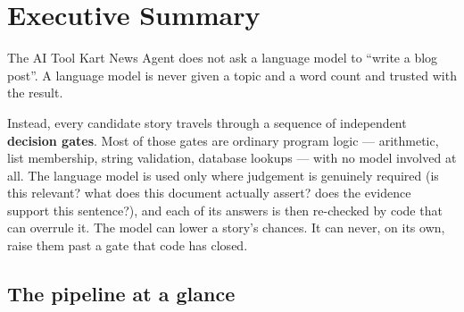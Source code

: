 \documentclass[11pt,a4paper]{article}
\begin{document}
\newpage
\hypersetup{pageanchor=true}
{\color{aitkNavy}\hypersetup{linkcolor=aitkNavy}
\tableofcontents}
\clearpage
{}

\section{Executive Summary}

The AI Tool Kart News Agent does not ask a language model to ``write a blog
post''. A language model is never given a topic and a word count and trusted with
the result.

Instead, every candidate story travels through a sequence of independent
\textbf{decision gates}. Most of those gates are ordinary program logic --- arithmetic,
list membership, string validation, database lookups --- with no model involved at
all. The language model is used only where judgement is genuinely required
(is this relevant? what does this document actually assert? does the evidence
support this sentence?), and each of its answers is then re-checked by code that
can overrule it. The model can lower a story's chances. It can never, on its own,
raise them past a gate that code has closed.

\subsection{The pipeline at a glance}
\end{document}
